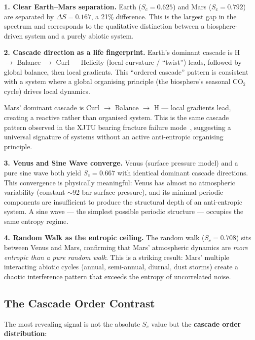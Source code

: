 \documentclass[12pt,a4paper]{article}
\begin{document}
\textbf{1. Clear Earth--Mars separation.}
Earth ($S_c = 0.625$) and Mars ($S_c = 0.792$) are separated by
$\Delta S = 0.167$, a 21\% difference. This is the largest gap in the
spectrum and corresponds to the qualitative distinction between a
biosphere-driven system and a purely abiotic system.

\textbf{2. Cascade direction as a life fingerprint.}
Earth's dominant cascade is H $\rightarrow$ Balance $\rightarrow$ Curl
--- Helicity (local curvature / ``twist'') leads, followed by global
balance, then local gradients. This ``ordered cascade'' pattern is
consistent with a system where a global organising principle (the
biosphere's seasonal CO$_2$ cycle) drives local dynamics.

Mars' dominant cascade is Curl $\rightarrow$ Balance $\rightarrow$ H
--- local gradients lead, creating a reactive rather than organised
system. This is the same cascade pattern observed in the XJTU bearing
fracture failure mode~\cite{cascade_entropy_v5}, suggesting a universal
signature of systems without an active anti-entropic organising principle.

\textbf{3. Venus and Sine Wave converge.}
Venus (surface pressure model) and a pure sine wave both yield $S_c =
0.667$ with identical dominant cascade directions. This convergence is
physically meaningful: Venus has almost no atmospheric variability
(constant $\sim$92 bar surface pressure), and its minimal periodic
components are insufficient to produce the structural depth of an
anti-entropic system. A sine wave --- the simplest possible periodic
structure --- occupies the same entropy regime.

\textbf{4. Random Walk as the entropic ceiling.}
The random walk ($S_c = 0.708$) sits between Venus and Mars, confirming
that Mars' atmospheric dynamics are \emph{more entropic than a pure random
walk}. This is a striking result: Mars' multiple interacting abiotic
cycles (annual, semi-annual, diurnal, dust storms) create a chaotic
interference pattern that exceeds the entropy of uncorrelated noise.

\subsection{The Cascade Order Contrast}

The most revealing signal is not the absolute $S_c$ value but the
\textbf{cascade order distribution}:
\end{document}
